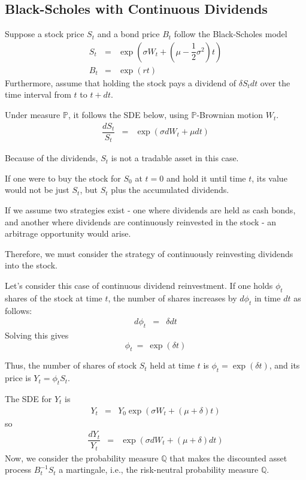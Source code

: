 \documentclass[uplatex,a4j,12pt,dvipdfmx]{jsarticle}
\begin{document}
\subsection{Black-Scholes with Continuous Dividends}

Suppose a stock price $S_{t}$ and a bond price $B_{t}$ follow the Black-Scholes model
%
%
\begin{eqnarray*}
	S_{t}
	&=&
	\exp \left( \sigma W_{t} + \left( \mu - \dfrac{1}{2} \sigma^{2} \right) t \right)
	\\
	B_{t}
	&=&
	\exp (rt)
\end{eqnarray*}
%
%
Furthermore, assume that holding the stock pays a dividend of $\delta S_{t} dt$ over the time interval from $t$ to $t+dt$.

Under measure $\mathbb{P}$, it follows the SDE below, using $\mathbb{P}$-Brownian motion $W_{t}$.
%
%
\begin{eqnarray*}
	\dfrac{dS_{t}}{S_{t}}
	&=&
	\exp \left( \sigma dW_{t} + \mu dt \right)
\end{eqnarray*}
%
%

Because of the dividends, $S_{t}$ is not a tradable asset in this case.

If one were to buy the stock for $S_{0}$ at $t=0$ and hold it until time $t$, its value would not be just $S_{t}$, but $S_{t}$ plus the accumulated dividends.

If we assume two strategies exist - one where dividends are held as cash bonds, and another where dividends are continuously reinvested in the stock - an arbitrage opportunity would arise.

Therefore, we must consider the strategy of continuously reinvesting dividends into the stock.

Let's consider this case of continuous dividend reinvestment. If one holds $\phi_{t}$ shares of the stock at time $t$, the number of shares increases by $d \phi_{t}$ in time $dt$ as follows:
%
%
\begin{eqnarray*}
	d \phi_{t}
	&=&
	\delta dt
\end{eqnarray*}
%
%
Solving this gives
$$
	\phi_{t}
	\ = \
	\exp ( \delta t )
$$

Thus, the number of shares of stock $S_{t}$ held at time $t$ is $\phi_{t} = \exp ( \delta t)$, and its price is $Y_{t} = \phi_{t} S_{t}$.

The SDE for $Y_{t}$ is
%
%
\begin{eqnarray*}
	Y_{t}
	&=&
	Y_{0} \exp \left( \sigma W_{t} + (\mu + \delta) t \right)
\end{eqnarray*}
%
%
so
%
%
\begin{eqnarray*}
	\dfrac{dY_{t}}{Y_{t}}
	&=&
	\exp \left( \sigma dW_{t} + (\mu + \delta) dt \right)
\end{eqnarray*}
%
%
Now, we consider the probability measure $\mathbb{Q}$ that makes the discounted asset process $B^{-1}_{t} S_{t}$ a martingale, i.e., the risk-neutral probability measure $\mathbb{Q}$.
\end{document}
